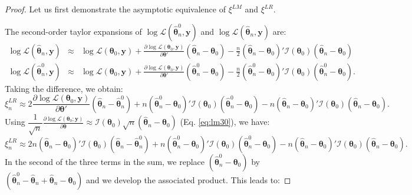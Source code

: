 \documentclass[
]{book}
\theoremstyle{definition}
\theoremstyle{definition}
\theoremstyle{definition}
\theoremstyle{definition}
\theoremstyle{remark}
\begin{document}
\begin{proof}
Let us first demonstrate the asymptotic equivalence of \(\xi^{LM}\) and \(\xi^{LR}\).

The second-order taylor expansions of \(\log \mathcal{L}(\hat{\boldsymbol\theta}^0_n,\mathbf{y})\) and \(\log \mathcal{L}(\hat{\boldsymbol\theta}_n,\mathbf{y})\) are:
\begin{eqnarray*}
\log \mathcal{L}(\hat{\boldsymbol\theta}_n,\mathbf{y}) &\approx& \log \mathcal{L}(\boldsymbol\theta_0,\mathbf{y})
+ \frac{\partial \log \mathcal{L}(\boldsymbol\theta_0,\mathbf{y})}{\partial \boldsymbol\theta'}(\hat{\boldsymbol\theta}_n-\boldsymbol\theta_0)
- \frac{n}{2} (\hat{\boldsymbol\theta}_n-\boldsymbol\theta_0)' \mathcal{I}(\boldsymbol\theta_0) (\hat{\boldsymbol\theta}_n-\boldsymbol\theta_0)\\
\log \mathcal{L}(\hat{\boldsymbol\theta}^0_n,\mathbf{y}) &\approx& \log \mathcal{L}(\boldsymbol\theta_0,\mathbf{y})
+ \frac{\partial \log \mathcal{L}(\boldsymbol\theta_0,\mathbf{y})}{\partial \boldsymbol\theta'}(\hat{\boldsymbol\theta}^0_n-\boldsymbol\theta_0)
- \frac{n}{2} (\hat{\boldsymbol\theta}^0_n-\boldsymbol\theta_0)' \mathcal{I}(\boldsymbol\theta_0) (\hat{\boldsymbol\theta}^0_n-\boldsymbol\theta_0).
\end{eqnarray*}
Taking the difference, we obtain:
\[
\xi_n^{LR} \approx 2\frac{\partial \log \mathcal{L}(\boldsymbol\theta_0,\mathbf{y})}{\partial \boldsymbol\theta'}
(\hat{\boldsymbol\theta}_n-\hat{\boldsymbol\theta}^0_n) + n (\hat{\boldsymbol\theta}^0_n-\boldsymbol\theta_0)' \mathcal{I}(\boldsymbol\theta_0) (\hat{\boldsymbol\theta}^0_n-\boldsymbol\theta_0) - n (\hat{\boldsymbol\theta}_n-\boldsymbol\theta_0)' \mathcal{I}(\boldsymbol\theta_0) (\hat{\boldsymbol\theta}_n-\boldsymbol\theta_0).
\]
Using \(\dfrac{1}{\sqrt{n}}\frac{\partial \log \mathcal{L}(\boldsymbol\theta_0;\mathbf{y})}{\partial \boldsymbol\theta} \approx \mathcal{I}(\boldsymbol\theta_0)\sqrt{n}(\hat{\boldsymbol\theta}_n-\boldsymbol\theta_0)\) (Eq. \eqref{eq:lm30}), we have:
\[
\xi_n^{LR} \approx
2n(\hat{\boldsymbol\theta}_n-\boldsymbol\theta_0)'\mathcal{I}(\boldsymbol\theta_0)
(\hat{\boldsymbol\theta}_n-\hat{\boldsymbol\theta}^0_n)
+ n (\hat{\boldsymbol\theta}^0_n-\boldsymbol\theta_0)' \mathcal{I}(\boldsymbol\theta_0) (\hat{\boldsymbol\theta}^0_n-\boldsymbol\theta_0) - n (\hat{\boldsymbol\theta}_n-\boldsymbol\theta_0)' \mathcal{I}(\boldsymbol\theta_0) (\hat{\boldsymbol\theta}_n-\boldsymbol\theta_0).
\]
In the second of the three terms in the sum, we replace \((\hat{\boldsymbol\theta}^0_n-\boldsymbol\theta_0)\) by \((\hat{\boldsymbol\theta}^0_n-\hat{\boldsymbol\theta}_n+\hat{\boldsymbol\theta}_n-\boldsymbol\theta_0)\) and we develop the associated product. This leads to:

\end{proof}
\end{document}
